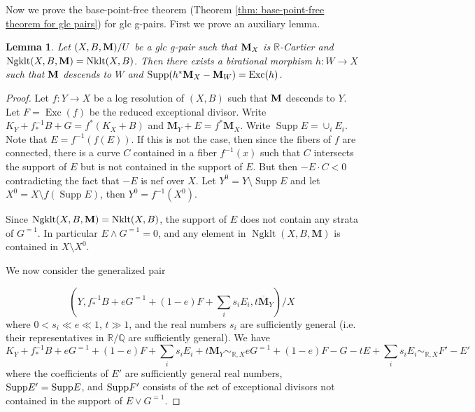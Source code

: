 \documentclass[11pt]{amsart}
\numberwithin{equation}{section}
\newcommand{\Mm}{{\bf{M}}}
\newcommand{\Rr}{\mathbb{R}}
\newcommand{\Exc}{\operatorname{Exc}}
\newcommand{\Nklt}{\operatorname{Nklt}}
\newcommand{\Supp}{\operatorname{Supp}}
\newcommand{\Ngklt}{\operatorname{Ngklt}}
\newtheorem{lem}[thm]{Lemma}
\theoremstyle{definition}
\theoremstyle{definition}
\theoremstyle{definition}
\begin{document}
Now we prove the base-point-free theorem (Theorem \ref{thm: base-point-free theorem for glc pairs}) for glc g-pairs. First we prove an auxiliary lemma.

 \begin{lem}\label{lem: special extraction}
 Let $(X,B,\Mm)/U$ be a glc g-pair such that $\Mm_X$ is $\Rr$-Cartier and $\Ngklt(X,B,\Mm)=\Nklt(X,B)$. Then there exists a birational morphism $h: W\rightarrow X$ such that $\Mm$ descends to $W$ and $\Supp(h^*\Mm_X-\Mm_W)=\Exc(h)$.
 \end{lem}
 
 \begin{proof}
Let $f: Y\rightarrow X$ be a log resolution of $(X,B)$ such that $\Mm$ descends to $Y$. Let $F=\Exc(f)$ be the reduced exceptional divisor. Write $K_Y+f^{-1}_*B+G=f^*(K_X+B)$ and $\mathbf M_Y+E=f^*\mathbf M_X$. Write $\Supp E=\cup_i E_i$. Note that $E=f^{-1}(f(E))$. If this is not the case, then since the fibers of $f$ are connected, there is a curve $C$ contained in a fiber $f^{-1}(x)$ such that $C$ intersects the support of $E$ but is not contained in the support of $E$. But then $-E\cdot C<0$ contradicting the fact that $-E$ is nef over $X$. Let $Y^0=Y\setminus\Supp E$ and let $X^0=X\setminus f(\Supp E)$, then $Y^0=f^{-1}(X^0)$. 

Since $\Ngklt(X,B,\Mm)=\Nklt(X,B)$, the support of $E$ does not contain any strata of $G^{=1}$. In particular $E \wedge G^{=1}=0$, and any element in $\Ngklt(X,B,\mathbf M)$ is contained in $X\setminus X^0$. 
       
       We now consider the generalized pair

      \[ (Y,f^{-1}_*B+e G^{=1}+(1-e)F+\sum_is_iE_i, {t\overline{\mathbf M}_Y})/X\]
where $0<s_i\ll e\ll 1$, $t\gg 1$, and the real numbers $s_i$ are sufficiently general (i.e. their representatives in $\mathbb R/\mathbb Q$ are sufficiently general). 
We have
$$K_Y+f^{-1}_*B+eG^{=1}+(1-e)F+\sum_is_iE_i+t\mathbf M_Y\sim_{\mathbb R,X}eG^{=1} +(1-e)F-G-tE+\sum_is_iE_i\sim _{\mathbb R,X} F'-E'$$
where the coefficients of $E'$ are sufficiently general real numbers, 
${\rm Supp} E'={\rm Supp} E$, and ${\rm Supp} F'$ consists of the set of exceptional divisors not contained in the support of $E\vee G^{=1}$.%



\end{proof}
\end{document}
